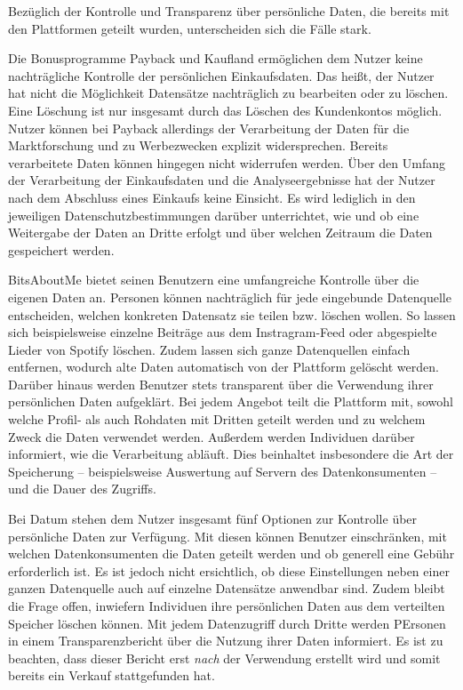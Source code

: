 \noindent Bezüglich der Kontrolle und Transparenz über persönliche Daten, die bereits mit den Plattformen geteilt wurden, unterscheiden sich die Fälle stark. \newline

\noindent Die Bonusprogramme Payback und Kaufland ermöglichen dem Nutzer keine nachträgliche Kontrolle der persönlichen Einkaufsdaten. Das heißt, der Nutzer hat nicht die Möglichkeit Datensätze nachträglich zu bearbeiten oder zu löschen. Eine Löschung ist nur insgesamt durch das Löschen des Kundenkontos möglich. Nutzer können bei Payback allerdings der Verarbeitung der Daten für die Marktforschung und zu Werbezwecken explizit widersprechen. Bereits verarbeitete Daten können hingegen nicht widerrufen werden. Über den Umfang der Verarbeitung der Einkaufsdaten und die Analyseergebnisse hat der Nutzer nach dem Abschluss eines Einkaufs keine Einsicht. Es wird lediglich in den jeweiligen Datenschutzbestimmungen darüber unterrichtet, wie und ob eine Weitergabe der Daten an Dritte erfolgt und über welchen Zeitraum die Daten gespeichert werden. \newline

\noindent BitsAboutMe bietet seinen Benutzern eine umfangreiche Kontrolle über die eigenen Daten an. Personen können nachträglich für jede eingebunde Datenquelle entscheiden, welchen konkreten Datensatz sie teilen bzw. löschen wollen. So lassen sich beispielsweise einzelne Beiträge aus dem Instragram-Feed oder abgespielte Lieder von Spotify löschen. Zudem lassen sich ganze Datenquellen einfach entfernen, wodurch alte Daten automatisch von der Plattform gelöscht werden. Darüber hinaus werden Benutzer stets transparent über die Verwendung ihrer persönlichen Daten aufgeklärt. Bei jedem Angebot teilt die Plattform mit, sowohl welche Profil- als auch Rohdaten mit Dritten geteilt werden und zu welchem Zweck die Daten verwendet werden. Außerdem werden Individuen darüber informiert, wie die Verarbeitung abläuft. Dies beinhaltet insbesondere die Art der Speicherung -- beispielsweise Auswertung auf Servern des Datenkonsumenten -- und die Dauer des Zugriffs. \newline

\noindent Bei Datum stehen dem Nutzer insgesamt fünf Optionen zur Kontrolle über persönliche Daten zur Verfügung. Mit diesen können Benutzer einschränken, mit welchen Datenkonsumenten die Daten geteilt werden und ob generell eine Gebühr erforderlich ist. Es ist jedoch nicht ersichtlich, ob diese Einstellungen neben einer ganzen Datenquelle auch auf einzelne Datensätze anwendbar sind. Zudem bleibt die Frage offen, inwiefern Individuen ihre persönlichen Daten aus dem verteilten Speicher löschen können. Mit jedem Datenzugriff durch Dritte werden PErsonen in einem Transparenzbericht über die Nutzung ihrer Daten informiert. Es ist zu beachten, dass dieser Bericht erst \textit{nach} der Verwendung erstellt wird und somit bereits ein Verkauf stattgefunden hat. \newline

